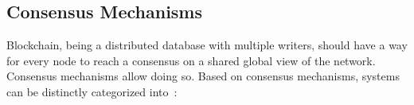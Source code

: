\subsection{Consensus Mechanisms}\label{subsec:consensus}
Blockchain, being a distributed database with multiple writers, should have a
way for every node to reach a consensus on a shared global view of the network.
Consensus mechanisms allow doing so. Based on consensus mechanisms, systems can
be distinctly categorized into~\cite{HashgraphConsensusCategory}:
